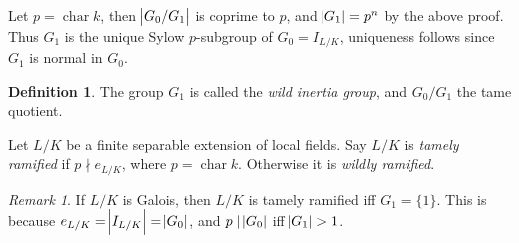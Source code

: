 \documentclass[11pt]{article}
\theoremstyle{definition}
\newtheorem{definition}{Definition}[subsection]
\theoremstyle{plain}
\theoremstyle{remark}
\newtheorem*{remark}{Remark}
\DeclareMathOperator{\Char}{char}
\begin{document}
Let $p = \Char{k}$, then $\abs{G_0 / G_1}$ is coprime to $p$, and $\abs{G_1} = p^n$ by the above proof. Thus $G_1$ is the unique Sylow $p$-subgroup of $G_0 = I_{L/K}$, uniqueness follows since $G_1$ is normal in $G_0$.

\begin{definition}\label{def:14_4}
    The group $G_1$ is called the \emph{wild inertia group}, and $G_0 / G_1$ the tame quotient.

    Let $L/K$ be a finite separable extension of local fields. Say $L/K$ is \emph{tamely ramified} if $p \nmid e_{L/K}$, where $p = \Char k$. Otherwise it is \emph{wildly ramified}.
\end{definition}

\begin{remark}
    If $L/K$ is Galois, then $L/K$ is tamely ramified iff $G_1 = \{1\}$. This is because $e_{L/K} = \abs{I_{L/K}} = \abs{G_0}$, and $p \mid \abs{G_0}$ iff $\abs{G_1} > 1$.
\end{remark}
\end{document}
